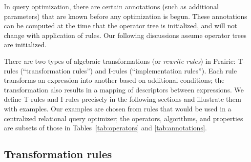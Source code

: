 In query optimization, there are certain annotations (such as
additional parameters) that are known before any optimization is
begun.  These annotations can be computed at the time that the operator
tree is initialized, and will not change with application of rules.
Our following discussions assume operator trees are initialized.

There are two types of algebraic transformations (or \emph{rewrite
rules}) in Prairie: T-rules (``transformation rules'') and I-rules
(``implementation rules'').  Each rule transforms an expression into
another based on additional conditions; the transformation also results
in a mapping of descriptors between expressions.  We define T-rules and
I-rules precisely in the following sections and illustrate them with
examples.  Our examples are chosen from rules that would be used in a
centralized relational query optimizer; the operators, algorithms, and
properties are subsets of those in Tables~\ref{tab:operators} and
\ref{tab:annotations}.

\subsection{Transformation rules}
\label{sec:trules}

